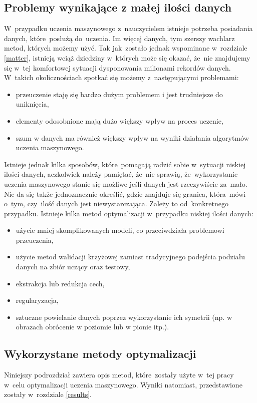 \subsection{Problemy wynikające z małej ilości danych}\label{problems}
W~przypadku uczenia maszynowego z~nauczycielem istnieje potrzeba posiadania danych, które~posłużą do~uczenia. Im więcej danych, tym szerszy wachlarz metod, których możemy użyć. Tak jak~zostało jednak wspominane w~rozdziale \ref{matter}, istnieją wciąż dziedziny w~których może się okazać, że~nie znajdujemy się w~tej komfortowej sytuacji dysponowania milionami rekordów danych. W~takich okolicznościach spotkać się możemy z~następującymi problemami:

\begin{itemize}
\item przeuczenie staję się bardzo dużym problemem i jest trudniejsze do uniknięcia,
\item elementy odosobnione mają dużo większy wpływ na proces uczenie,
\item szum w danych ma również większy wpływ na wyniki działania algorytmów uczenia maszynowego.
\end{itemize}
Istnieje jednak kilka sposobów, które~pomagają radzić sobie w~sytuacji niskiej ilości danych, aczkolwiek należy pamiętać, że~nie sprawią, że~wykorzystanie uczenia maszynowego stanie się możliwe jeśli danych jest rzeczywiście za~mało. Nie da się także jednoznacznie określić, gdzie znajduje się granica, która~mówi o~tym, czy~ilość danych jest niewystarczająca. Zależy to od~konkretnego przypadku. Istnieje kilka metod optymalizacji w~przypadku niskiej ilości danych:
\begin{itemize}
\item użycie mniej skomplikowanych modeli, co przeciwdziała problemowi przeuczenia,
\item użycie metod walidacji krzyżowej zamiast tradycyjnego podejścia podziału danych na zbiór uczący oraz testowy,
\item ekstrakcja lub redukcja cech,
\item regularyzacja,
\item sztuczne powielanie danych poprzez wykorzystanie ich symetrii (np. w obrazach obrócenie w poziomie lub w pionie itp.).
\end{itemize}


\subsection{Wykorzystane metody optymalizacji}
Niniejszy podrozdział zawiera opis metod, które~zostały użyte w~tej pracy w~celu optymalizacji uczenia maszynowego. Wyniki 
natomiast, przedstawione zostały w~rozdziale \ref{results}.
